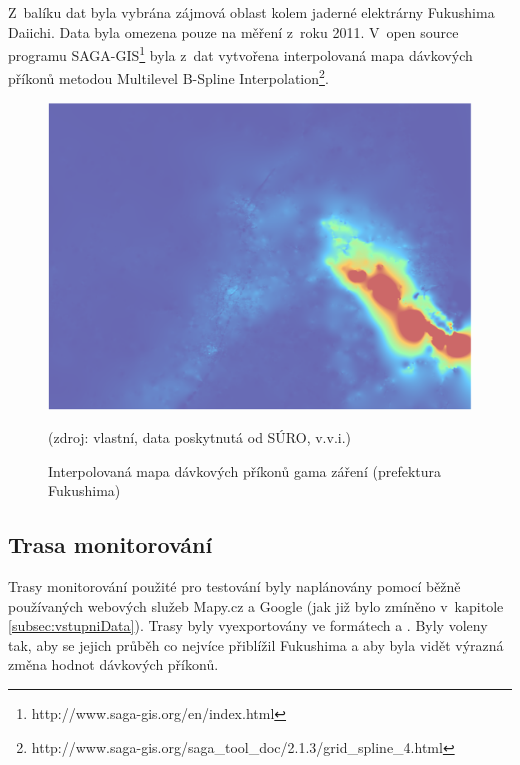 Z~balíku dat byla vybrána zájmová oblast kolem jaderné elektrárny
Fukushima Daiichi. Data byla omezena pouze na měření z~roku
2011. V~open source programu
SAGA-GIS\footnote{http://www.saga-gis.org/en/index.html} byla z~dat
vytvořena interpolovaná mapa dávkových příkonů metodou Multilevel
B-Spline
Interpolation\footnote{http://www.saga-gis.org/saga\_tool\_doc/2.1.3/grid\_spline\_4.html}.

\begin{figure}[H] \centering
    \includegraphics[scale=0.4]{./pictures/interpolovana_mapa.png}
      	\caption[Interpolovaná mapa dávkových příkonů (prefektura
Fukushima)]{Interpolovaná mapa dávkových příkonů gama záření
(prefektura Fukushima)}(zdroj: vlastní, data poskytnutá od SÚRO,
v.v.i.)
    	\label{fig:interpolatedMap}
\end{figure}

\subsection{Trasa monitorování} Trasy monitorování použité pro
testování byly naplánovány pomocí běžně používaných webových služeb
Mapy.cz a Google (jak již bylo zmíněno v~kapitole
\ref{subsec:vstupniData}). Trasy byly vyexportovány ve formátech
 a . Byly voleny tak, aby se jejich průběh co nejvíce
přiblížil  Fukushima a aby byla vidět výrazná změna hodnot
dávkových příkonů.

